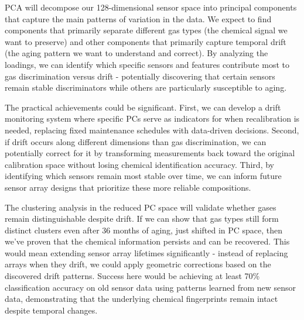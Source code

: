 \documentclass[
  letterpaper,
  DIV=11,
  numbers=noendperiod]{scrartcl}
\begin{document}
PCA will decompose our 128-dimensional sensor space into principal
components that capture the main patterns of variation in the data. We
expect to find components that primarily separate different gas types
(the chemical signal we want to preserve) and other components that
primarily capture temporal drift (the aging pattern we want to
understand and correct). By analyzing the loadings, we can identify
which specific sensors and features contribute most to gas
discrimination versus drift - potentially discovering that certain
sensors remain stable discriminators while others are particularly
susceptible to aging.

The practical achievements could be significant. First, we can develop a
drift monitoring system where specific PCs serve as indicators for when
recalibration is needed, replacing fixed maintenance schedules with
data-driven decisions. Second, if drift occurs along different
dimensions than gas discrimination, we can potentially correct for it by
transforming measurements back toward the original calibration space
without losing chemical identification accuracy. Third, by identifying
which sensors remain most stable over time, we can inform future sensor
array designs that prioritize these more reliable compositions.

The clustering analysis in the reduced PC space will validate whether
gases remain distinguishable despite drift. If we can show that gas
types still form distinct clusters even after 36 months of aging, just
shifted in PC space, then we've proven that the chemical information
persists and can be recovered. This would mean extending sensor array
lifetimes significantly - instead of replacing arrays when they drift,
we could apply geometric corrections based on the discovered drift
patterns. Success here would be achieving at least 70\% classification
accuracy on old sensor data using patterns learned from new sensor data,
demonstrating that the underlying chemical fingerprints remain intact
despite temporal
changes.\hspace{0pt}\hspace{0pt}\hspace{0pt}\hspace{0pt}\hspace{0pt}\hspace{0pt}\hspace{0pt}\hspace{0pt}\hspace{0pt}\hspace{0pt}\hspace{0pt}\hspace{0pt}\hspace{0pt}\hspace{0pt}\hspace{0pt}\hspace{0pt}
\end{document}
